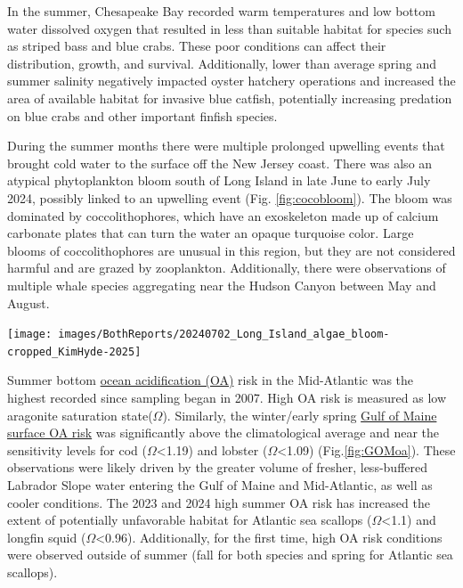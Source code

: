 \documentclass[
  10pt,
]{article}
\let\origfigure\figure
\let\endorigfigure\endfigure
\renewenvironment{figure}[1][2] {
    \expandafter\origfigure\expandafter[H]
} {
    \endorigfigure
}
\begin{document}
In the summer, Chesapeake Bay recorded warm temperatures and low bottom water dissolved oxygen that resulted in less than suitable habitat for species such as striped bass and blue crabs. These poor conditions can affect their distribution, growth, and survival. Additionally, lower than average spring and summer salinity negatively impacted oyster hatchery operations and increased the area of available habitat for invasive blue catfish, potentially increasing predation on blue crabs and other important finfish species.

During the summer months there were multiple prolonged upwelling events that brought cold water to the surface off the New Jersey coast. There was also an atypical phytoplankton bloom south of Long Island in late June to early July 2024, possibly linked to an upwelling event (Fig. \ref{fig:cocobloom}). The bloom was dominated by coccolithophores, which have an exoskeleton made up of calcium carbonate plates that can turn the water an opaque turquoise color. Large blooms of coccolithophores are unusual in this region, but they are not considered harmful and are grazed by zooplankton. Additionally, there were observations of multiple whale species aggregating near the Hudson Canyon between May and August.

\begin{figure}

{\centering \texttt{[image: images/BothReports/20240702\_Long\_Island\_algae\_bloom-cropped\_KimHyde-2025]} 

}

\caption{An OLCI Sentinel 3A true color image with enhanced contrast captured on July 2, 2024. Coccolithophores shed their coccolith plates during the later stages of the bloom cycle, which results in the milky turquoise water color (Image credit: NOAA STAR, OCView and Ocean Color Science Team).}\label{fig:cocobloom}
\end{figure}

Summer bottom \href{https://noaa-edab.github.io/catalog/ocean_acidification.html}{ocean acidification (OA)} risk in the Mid-Atlantic was the highest recorded since sampling began in 2007. High OA risk is measured as low aragonite saturation state(\(\Omega\)). Similarly, the winter/early spring \href{https://noaa-edab.github.io/catalog/gom_acidification.html}{Gulf of Maine surface OA risk} was significantly above the climatological average and near the sensitivity levels for cod (\(\Omega\)\textless1.19) and lobster (\(\Omega\)\textless1.09) (Fig.\ref{fig:GOMoa}). These observations were likely driven by the greater volume of fresher, less-buffered Labrador Slope water entering the Gulf of Maine and Mid-Atlantic, as well as cooler conditions. The 2023 and 2024 high summer OA risk has increased the extent of potentially unfavorable habitat for Atlantic sea scallops (\(\Omega\)\textless1.1) and longfin squid (\(\Omega\)\textless0.96). Additionally, for the first time, high OA risk conditions were observed outside of summer (fall for both species and spring for Atlantic sea scallops).
\end{document}
